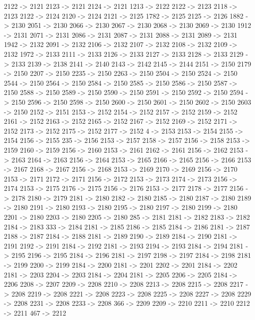 {	2122 -> 2121
	2123 -> 2121
	2124 -> 2121
	1213 -> 2122
	2122 -> 2123
	2118 -> 2123
	2122 -> 2124
	2120 -> 2124
	2121 -> 2125
	1782 -> 2125
	2125 -> 2126
	1882 -> 2130
	2051 -> 2130
	2066 -> 2130
	2067 -> 2130
	2068 -> 2130
	2069 -> 2130
	1912 -> 2131
	2071 -> 2131
	2086 -> 2131
	2087 -> 2131
	2088 -> 2131
	2089 -> 2131
	1942 -> 2132
	2091 -> 2132
	2106 -> 2132
	2107 -> 2132
	2108 -> 2132
	2109 -> 2132
	1972 -> 2133
	2111 -> 2133
	2126 -> 2133
	2127 -> 2133
	2128 -> 2133
	2129 -> 2133
	2139 -> 2138
	2141 -> 2140
	2143 -> 2142
	2145 -> 2144
	2151 -> 2150
	2179 -> 2150
	2207 -> 2150
	2235 -> 2150
	2263 -> 2150
	2504 -> 2150
	2524 -> 2150
	2544 -> 2150
	2564 -> 2150
	2584 -> 2150
	2585 -> 2150
	2586 -> 2150
	2587 -> 2150
	2588 -> 2150
	2589 -> 2150
	2590 -> 2150
	2591 -> 2150
	2592 -> 2150
	2594 -> 2150
	2596 -> 2150
	2598 -> 2150
	2600 -> 2150
	2601 -> 2150
	2602 -> 2150
	2603 -> 2150
	2152 -> 2151
	2153 -> 2152
	2154 -> 2152
	2157 -> 2152
	2159 -> 2152
	2161 -> 2152
	2163 -> 2152
	2165 -> 2152
	2167 -> 2152
	2169 -> 2152
	2171 -> 2152
	2173 -> 2152
	2175 -> 2152
	2177 -> 2152
	4 -> 2153
	2153 -> 2154
	2155 -> 2154
	2156 -> 2155
	235 -> 2156
	2153 -> 2157
	2158 -> 2157
	2156 -> 2158
	2153 -> 2159
	2160 -> 2159
	2156 -> 2160
	2153 -> 2161
	2162 -> 2161
	2156 -> 2162
	2153 -> 2163
	2164 -> 2163
	2156 -> 2164
	2153 -> 2165
	2166 -> 2165
	2156 -> 2166
	2153 -> 2167
	2168 -> 2167
	2156 -> 2168
	2153 -> 2169
	2170 -> 2169
	2156 -> 2170
	2153 -> 2171
	2172 -> 2171
	2156 -> 2172
	2153 -> 2173
	2174 -> 2173
	2156 -> 2174
	2153 -> 2175
	2176 -> 2175
	2156 -> 2176
	2153 -> 2177
	2178 -> 2177
	2156 -> 2178
	2180 -> 2179
	2181 -> 2180
	2182 -> 2180
	2185 -> 2180
	2187 -> 2180
	2189 -> 2180
	2191 -> 2180
	2193 -> 2180
	2195 -> 2180
	2197 -> 2180
	2199 -> 2180
	2201 -> 2180
	2203 -> 2180
	2205 -> 2180
	285 -> 2181
	2181 -> 2182
	2183 -> 2182
	2184 -> 2183
	333 -> 2184
	2181 -> 2185
	2186 -> 2185
	2184 -> 2186
	2181 -> 2187
	2188 -> 2187
	2184 -> 2188
	2181 -> 2189
	2190 -> 2189
	2184 -> 2190
	2181 -> 2191
	2192 -> 2191
	2184 -> 2192
	2181 -> 2193
	2194 -> 2193
	2184 -> 2194
	2181 -> 2195
	2196 -> 2195
	2184 -> 2196
	2181 -> 2197
	2198 -> 2197
	2184 -> 2198
	2181 -> 2199
	2200 -> 2199
	2184 -> 2200
	2181 -> 2201
	2202 -> 2201
	2184 -> 2202
	2181 -> 2203
	2204 -> 2203
	2184 -> 2204
	2181 -> 2205
	2206 -> 2205
	2184 -> 2206
	2208 -> 2207
	2209 -> 2208
	2210 -> 2208
	2213 -> 2208
	2215 -> 2208
	2217 -> 2208
	2219 -> 2208
	2221 -> 2208
	2223 -> 2208
	2225 -> 2208
	2227 -> 2208
	2229 -> 2208
	2231 -> 2208
	2233 -> 2208
	366 -> 2209
	2209 -> 2210
	2211 -> 2210
	2212 -> 2211
	467 -> 2212
}
